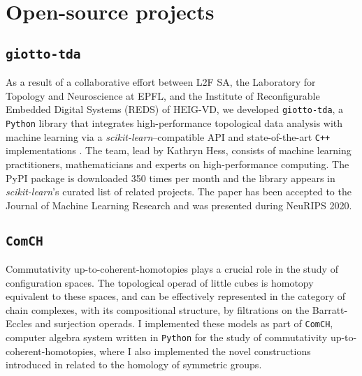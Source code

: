 
\section{Open-source projects}

\subsection{\texttt{giotto-tda}} As a result of a collaborative effort between L2F SA, the Laboratory for Topology and Neuroscience at EPFL, and the Institute of Reconfigurable Embedded Digital Systems (REDS) of HEIG-VD, we developed \texttt{giotto-tda}, a \texttt{Python} library that integrates high-performance topological data analysis with machine learning via a \emph{scikit-learn}--compatible API and state-of-the-art \texttt{C++} implementations \cite{medina2021giotto}.
The team, lead by Kathryn Hess, consists of machine learning practitioners, mathematicians and experts on high-performance computing.
The PyPI package is downloaded 350 times per month and the library appears in \emph{scikit-learn}'s curated list of related projects.
The paper has been accepted to the Journal of Machine Learning Research and was presented during NeuRIPS 2020.

\subsection{\texttt{ComCH}} Commutativity up-to-coherent-homotopies plays a crucial role in the study of configuration spaces.
The topological operad of little cubes is homotopy equivalent to these spaces, and can be effectively represented in the category of chain complexes, with its compositional structure, by filtrations on the Barratt-Eccles and surjection operads.
I implemented these models as part of \texttt{ComCH}, computer algebra system written in \texttt{Python} for the study of commutativity up-to-coherent-homotopies, where I also implemented the novel constructions introduced in \cite{medina2020maysteenrod} related to the homology of symmetric groups.

